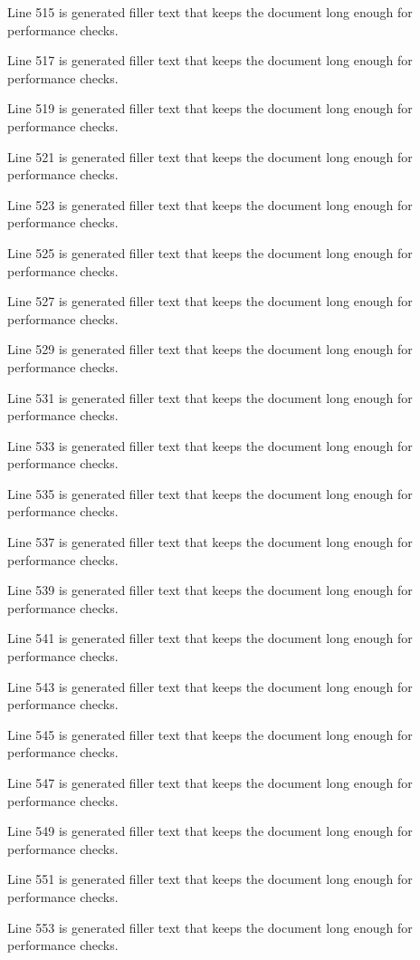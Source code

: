 Line 515 is generated filler text that keeps the document long enough for performance checks.

Line 517 is generated filler text that keeps the document long enough for performance checks.

Line 519 is generated filler text that keeps the document long enough for performance checks.

Line 521 is generated filler text that keeps the document long enough for performance checks.

Line 523 is generated filler text that keeps the document long enough for performance checks.

Line 525 is generated filler text that keeps the document long enough for performance checks.

Line 527 is generated filler text that keeps the document long enough for performance checks.

Line 529 is generated filler text that keeps the document long enough for performance checks.

Line 531 is generated filler text that keeps the document long enough for performance checks.

Line 533 is generated filler text that keeps the document long enough for performance checks.

Line 535 is generated filler text that keeps the document long enough for performance checks.

Line 537 is generated filler text that keeps the document long enough for performance checks.

Line 539 is generated filler text that keeps the document long enough for performance checks.

Line 541 is generated filler text that keeps the document long enough for performance checks.

Line 543 is generated filler text that keeps the document long enough for performance checks.

Line 545 is generated filler text that keeps the document long enough for performance checks.

Line 547 is generated filler text that keeps the document long enough for performance checks.

Line 549 is generated filler text that keeps the document long enough for performance checks.

Line 551 is generated filler text that keeps the document long enough for performance checks.

Line 553 is generated filler text that keeps the document long enough for performance checks.

